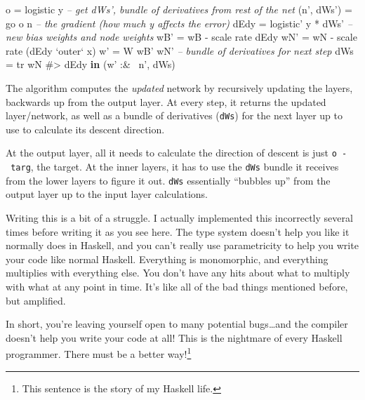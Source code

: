 \documentclass[]{article}
\newenvironment{Shaded}{}{}
\newcommand{\KeywordTok}[1]{\textcolor[rgb]{0.00,0.44,0.13}{\textbf{{#1}}}}
\newcommand{\DataTypeTok}[1]{\textcolor[rgb]{0.56,0.13,0.00}{{#1}}}
\newcommand{\CommentTok}[1]{\textcolor[rgb]{0.38,0.63,0.69}{\textit{{#1}}}}
\newcommand{\OtherTok}[1]{\textcolor[rgb]{0.00,0.44,0.13}{{#1}}}
\newcommand{\FunctionTok}[1]{\textcolor[rgb]{0.02,0.16,0.49}{{#1}}}
\newcommand{\NormalTok}[1]{{#1}}
\begin{document}
\begin{Shaded}
\begin{Highlighting}[]
              \NormalTok{o          }\FunctionTok{=} \NormalTok{logistic y}
              \CommentTok{-- get dWs', bundle of derivatives from rest of the net}
              \NormalTok{(n', dWs') }\FunctionTok{=} \NormalTok{go o n}
              \CommentTok{-- the gradient (how much y affects the error)}
              \NormalTok{dEdy       }\FunctionTok{=} \NormalTok{logistic' y }\FunctionTok{*} \NormalTok{dWs'}
              \CommentTok{-- new bias weights and node weights}
              \NormalTok{wB'  }\FunctionTok{=} \NormalTok{wB }\FunctionTok{-} \NormalTok{scale rate dEdy}
              \NormalTok{wN'  }\FunctionTok{=} \NormalTok{wN }\FunctionTok{-} \NormalTok{scale rate (dEdy }\OtherTok{`outer`} \NormalTok{x)}
              \NormalTok{w'   }\FunctionTok{=} \DataTypeTok{W} \NormalTok{wB' wN'}
              \CommentTok{-- bundle of derivatives for next step}
              \NormalTok{dWs  }\FunctionTok{=} \NormalTok{tr wN }\FunctionTok{#>} \NormalTok{dEdy}
          \KeywordTok{in}  \NormalTok{(w' }\FunctionTok{:&~} \NormalTok{n', dWs)}
\end{Highlighting}
\end{Shaded}

The algorithm computes the \emph{updated} network by recursively updating the
layers, backwards up from the output layer. At every step, it returns the
updated layer/network, as well as a bundle of derivatives (\texttt{dWs}) for the
next layer up to use to calculate its descent direction.

At the output layer, all it needs to calculate the direction of descent is just
\texttt{o\ -\ targ}, the target. At the inner layers, it has to use the
\texttt{dWs} bundle it receives from the lower layers to figure it out.
\texttt{dWs} essentially ``bubbles up'' from the output layer up to the input
layer calculations.

Writing this is a bit of a struggle. I actually implemented this incorrectly
several times before writing it as you see here. The type system doesn't help
you like it normally does in Haskell, and you can't really use parametricity to
help you write your code like normal Haskell. Everything is monomorphic, and
everything multiplies with everything else. You don't have any hits about what
to multiply with what at any point in time. It's like all of the bad things
mentioned before, but amplified.

In short, you're leaving yourself open to many potential bugs\ldots{}and the
compiler doesn't help you write your code at all! This is the nightmare of every
Haskell programmer. There must be a better way!\footnote{This sentence is the
  story of my Haskell life.}
\end{document}
